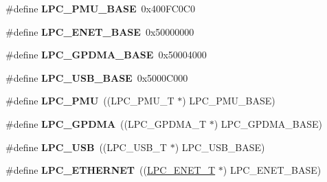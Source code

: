 \begin{DoxyCompactItemize}
\item 
\hypertarget{group___p_e_r_i_p_h__175_x__6_x___b_a_s_e_ga865bed8ad61e9e273439ad1349a46d68}{\#define {\bfseries L\+P\+C\+\_\+\+P\+M\+U\+\_\+\+B\+A\+S\+E}~0x400\+F\+C0\+C0}\label{group___p_e_r_i_p_h__175_x__6_x___b_a_s_e_ga865bed8ad61e9e273439ad1349a46d68}

\item 
\hypertarget{group___p_e_r_i_p_h__175_x__6_x___b_a_s_e_ga73c18d53000abe3814c4b787cd83a57c}{\#define {\bfseries L\+P\+C\+\_\+\+E\+N\+E\+T\+\_\+\+B\+A\+S\+E}~0x50000000}\label{group___p_e_r_i_p_h__175_x__6_x___b_a_s_e_ga73c18d53000abe3814c4b787cd83a57c}

\item 
\hypertarget{group___p_e_r_i_p_h__175_x__6_x___b_a_s_e_ga51ba8e3f33730fa2b78be3f892d8c278}{\#define {\bfseries L\+P\+C\+\_\+\+G\+P\+D\+M\+A\+\_\+\+B\+A\+S\+E}~0x50004000}\label{group___p_e_r_i_p_h__175_x__6_x___b_a_s_e_ga51ba8e3f33730fa2b78be3f892d8c278}

\item 
\hypertarget{group___p_e_r_i_p_h__175_x__6_x___b_a_s_e_gaa619008881e9f76dc31131313eff1b79}{\#define {\bfseries L\+P\+C\+\_\+\+U\+S\+B\+\_\+\+B\+A\+S\+E}~0x5000\+C000}\label{group___p_e_r_i_p_h__175_x__6_x___b_a_s_e_gaa619008881e9f76dc31131313eff1b79}

\item 
\hypertarget{group___p_e_r_i_p_h__175_x__6_x___b_a_s_e_ga9d540cc313db00679c10f9ac1961b06a}{\#define {\bfseries L\+P\+C\+\_\+\+P\+M\+U}~((L\+P\+C\+\_\+\+P\+M\+U\+\_\+\+T              $\ast$) L\+P\+C\+\_\+\+P\+M\+U\+\_\+\+B\+A\+S\+E)}\label{group___p_e_r_i_p_h__175_x__6_x___b_a_s_e_ga9d540cc313db00679c10f9ac1961b06a}

\item 
\hypertarget{group___p_e_r_i_p_h__175_x__6_x___b_a_s_e_gaf9d4b843ddff8d08a27880f90e2dbf18}{\#define {\bfseries L\+P\+C\+\_\+\+G\+P\+D\+M\+A}~((L\+P\+C\+\_\+\+G\+P\+D\+M\+A\+\_\+\+T            $\ast$) L\+P\+C\+\_\+\+G\+P\+D\+M\+A\+\_\+\+B\+A\+S\+E)}\label{group___p_e_r_i_p_h__175_x__6_x___b_a_s_e_gaf9d4b843ddff8d08a27880f90e2dbf18}

\item 
\hypertarget{group___p_e_r_i_p_h__175_x__6_x___b_a_s_e_gae77538a7f3f4850715c95283e38b423f}{\#define {\bfseries L\+P\+C\+\_\+\+U\+S\+B}~((L\+P\+C\+\_\+\+U\+S\+B\+\_\+\+T              $\ast$) L\+P\+C\+\_\+\+U\+S\+B\+\_\+\+B\+A\+S\+E)}\label{group___p_e_r_i_p_h__175_x__6_x___b_a_s_e_gae77538a7f3f4850715c95283e38b423f}

\item 
\hypertarget{group___p_e_r_i_p_h__175_x__6_x___b_a_s_e_gaddb977e4442891b21ced3344c71440d7}{\#define {\bfseries L\+P\+C\+\_\+\+E\+T\+H\+E\+R\+N\+E\+T}~((\hyperlink{struct_l_p_c___e_n_e_t___t}{L\+P\+C\+\_\+\+E\+N\+E\+T\+\_\+\+T}             $\ast$) L\+P\+C\+\_\+\+E\+N\+E\+T\+\_\+\+B\+A\+S\+E)}\label{group___p_e_r_i_p_h__175_x__6_x___b_a_s_e_gaddb977e4442891b21ced3344c71440d7}


\end{DoxyCompactItemize}
